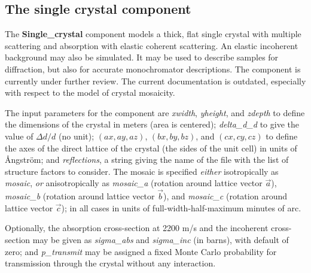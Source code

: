 \subsection*{The single crystal component}
\label{s:Single_crystal}


The \textbf{Single\_crystal} component models a thick, flat single crystal
with multiple scattering and absorption with elastic coherent scattering.
An elastic incoherent background may also be simulated.
It may be used to describe samples for diffraction,
but also for accurate monochromator descriptions.
The component is currently under further review. The current documentation is outdated, especially with respect to the model of crystal mosaicity.

The input parameters for the component are \textit{xwidth},
\textit{yheight}, and \textit{zdepth} to define the dimensions of the
crystal in meters (area is centered); \textit{delta\_d\_d} to give the
value of $\Delta d/d$ (no unit);
$(\textit{ax}, \textit{ay}, \textit{az})$, $(\textit{bx}, \textit{by},
\textit{bz})$, and $(\textit{cx}, \textit{cy}, \textit{cz})$ to define
the axes of the direct lattice of the crystal (the sides of the unit
cell) in units of Ångström; and \textit{reflections}, a string
giving the name of the file with the list of structure factors to
consider.
The mosaic is specified \emph{either} isotropically as
\textit{mosaic}, \emph{or} anisotropically as \textit{mosaic\_a}
(rotation around lattice vector $\vec a$), \textit{mosaic\_b} (rotation around lattice vector $\vec
b$), and \textit{mosaic\_c} (rotation around lattice vector $\vec c$); in all
cases in units of full-width-half-maximum minutes of arc.

Optionally, the absorption cross-section at 2200 m/s and the incoherent
cross-section may be given as \textit{sigma\_abs} and
\textit{sigma\_inc} (in barns), with default of zero; and
\textit{p\_transmit} may be assigned a fixed Monte Carlo probability for
transmission through the crystal without any interaction.

